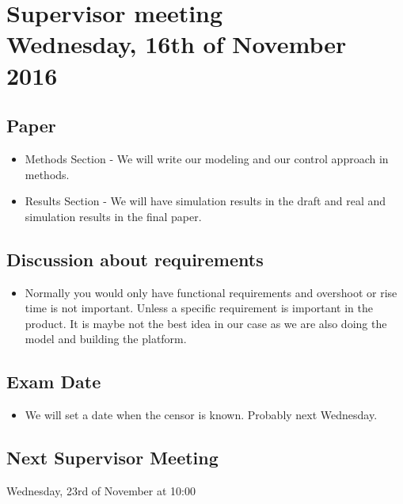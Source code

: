 
\renewcommand{\vec}[1]{\boldsymbol{\mathbf{#1}}}

\renewcommand\chaptername{KAPITEL}
\renewcommand\contentsname{Indhold}
\renewcommand\figurename{Figur}
\renewcommand\tablename{Tabel}

\section*{Supervisor meeting\\ \small Wednesday, 16th of November 2016}
\subsection{Paper}
\begin{itemize}
	\item Methods Section - We will write our modeling and our control approach in methods.
	\item Results Section - We will have simulation results in the draft and real and simulation results in the final paper.
\end{itemize}
\subsection{Discussion about requirements}
\begin{itemize}
	\item Normally you would only have functional requirements and overshoot or rise time is not important. Unless a specific requirement is important in the product. It is maybe not the best idea in our case as we are also doing the model and building the platform.
\end{itemize}	
\subsection{Exam Date}
\begin{itemize}
	\item We will set a date when the censor is known. Probably next Wednesday.
\end{itemize}
\subsection{Next Supervisor Meeting}
Wednesday, 23rd of November at 10:00

